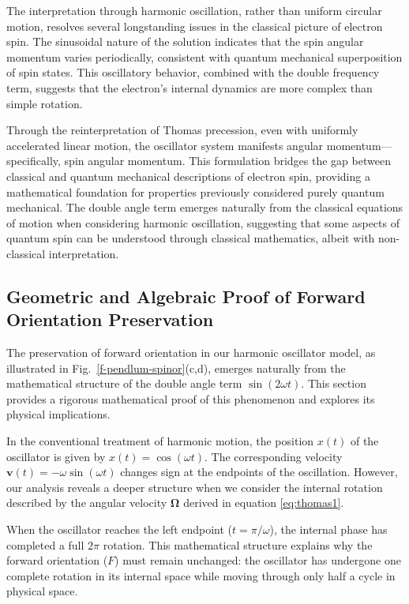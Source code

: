 \documentclass[%
 reprint,
 amsmath,amssymb,
 aps,
]{revtex4-1}
\numberwithin{equation}{section}%
\begin{document}
The interpretation through harmonic oscillation, rather than uniform circular motion, resolves several longstanding issues in the classical picture of electron spin. The sinusoidal nature of the solution indicates that the spin angular momentum varies periodically, consistent with quantum mechanical superposition of spin states. This oscillatory behavior, combined with the double frequency term, suggests that the electron's internal dynamics are more complex than simple rotation.

Through the reinterpretation of Thomas precession, even with uniformly accelerated linear motion, the oscillator system manifests angular momentum—specifically, spin angular momentum. This formulation bridges the gap between classical and quantum mechanical descriptions of electron spin, providing a mathematical foundation for properties previously considered purely quantum mechanical. The double angle term emerges naturally from the classical equations of motion when considering harmonic oscillation, suggesting that some aspects of quantum spin can be understood through classical mathematics, albeit with non-classical interpretation.


\subsection{Geometric and Algebraic Proof of Forward Orientation Preservation}

The preservation of forward orientation in our harmonic oscillator model, as illustrated in Fig.~\ref{f-pendlum-spinor}(c,d), emerges naturally from the mathematical structure of the double angle term \( \sin(2\omega t) \). This section provides a rigorous mathematical proof of this phenomenon and explores its physical implications.

In the conventional treatment of harmonic motion, the position \( x(t) \) of the oscillator is given by \( x(t) = \cos(\omega t) \). The corresponding velocity \( \boldsymbol{v}(t) = -\omega\sin(\omega t) \) changes sign at the endpoints of the oscillation. However, our analysis reveals a deeper structure when we consider the internal rotation described by the angular velocity \( \boldsymbol{\Omega} \) derived in equation \eqref{eq:thomas1}.

When the oscillator reaches the left endpoint (\( t = \pi/\omega \)), the internal phase has completed a full \( 2\pi \) rotation. This mathematical structure explains why the forward orientation ($F$) must remain unchanged: the oscillator has undergone one complete rotation in its internal space while moving through only half a cycle in physical space.
\end{document}
